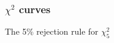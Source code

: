 \documentclass[handout]{beamer}
\begin{document}


   \begin{frame}
   \frametitle{$\chi^2$ curves}
   \begin{center}
   \end{center}
   The 5\% rejection rule for $\chi^2_5$
   \end{frame}


   \begin{frame} 

   \end{frame}

   
\end{document}
